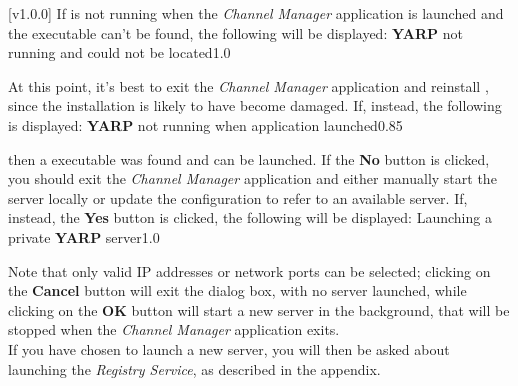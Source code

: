 [v1.0.0]
If \yarp{} is not running when the \emph{Channel Manager} application is launched and the
\yarp{} executable can't be found, the following will be displayed:
%
{\textbf{YARP} not running and could not be located}{1.0}

At this point, it's best to exit the \emph{Channel Manager} application and reinstall
\mplusm, since the installation is likely to have become damaged.
If, instead, the following is displayed:
%
{\textbf{YARP} not running when application launched}{0.85}

then a \yarp{} executable was found and can be launched.
If the \textbf{No} button is clicked, you should exit the \emph{Channel Manager}
application and either manually start the \yarp{} server locally or update the \yarp{}
configuration to refer to an available \yarp{} server.
\condPage{}
If, instead, the \textbf{Yes} button is clicked, the following will be displayed:
%
{Launching a private \textbf{YARP} server}{1.0}

Note that only valid IP addresses or network ports can be selected; clicking on the
\textbf{Cancel} button will exit the dialog box, with no \yarp{} server launched, while
clicking on the \textbf{OK} button will start a new \yarp{} server in the background, that
will be stopped when the \emph{Channel Manager} application exits.\\

If you have chosen to launch a new \yarp{} server, you will then be asked about launching
the \emph{Registry Service}, as described in the
 appendix.
\appendixEnd{}
